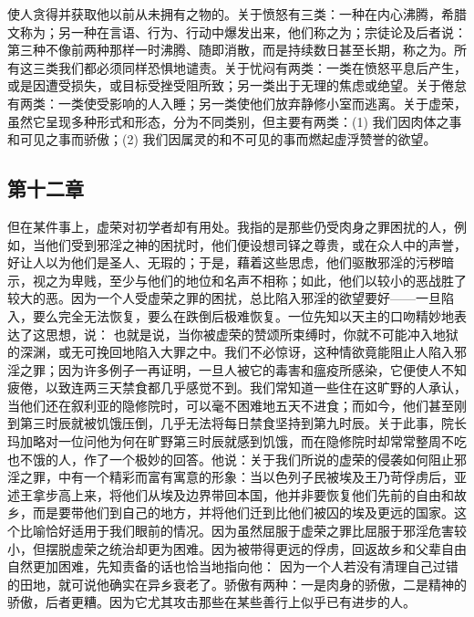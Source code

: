 使人贪得并获取他以前从未拥有之物的。关于愤怒有三类：一种在内心沸腾，希腊文称为；另一种在言语、行为、行动中爆发出来，他们称之为；宗徒论及后者说： 第三种不像前两种那样一时沸腾、随即消散，而是持续数日甚至长期，称之为。所有这三类我们都必须同样恐惧地谴责。关于忧闷有两类：一类在愤怒平息后产生，或是因遭受损失，或目标受挫受阻所致；另一类出于无理的焦虑或绝望。关于倦怠有两类：一类使受影响的人入睡；另一类使他们放弃静修小室而逃离。关于虚荣，虽然它呈现多种形式和形态，分为不同类别，但主要有两类：(1) 我们因肉体之事和可见之事而骄傲；(2) 我们因属灵的和不可见的事而燃起虚浮赞誉的欲望。\par


\subsection{第十二章}

\par

但在某件事上，虚荣对初学者却有用处。我指的是那些仍受肉身之罪困扰的人，例如，当他们受到邪淫之神的困扰时，他们便设想司铎之尊贵，或在众人中的声誉，好让人以为他们是圣人、无瑕的；于是，藉着这些思虑，他们驱散邪淫的污秽暗示，视之为卑贱，至少与他们的地位和名声不相称；如此，他们以较小的恶战胜了较大的恶。因为一个人受虚荣之罪的困扰，总比陷入邪淫的欲望要好——一旦陷入，要么完全无法恢复，要么在跌倒后极难恢复。一位先知以天主的口吻精妙地表达了这思想，说： 也就是说，当你被虚荣的赞颂所束缚时，你就不可能冲入地狱的深渊，或无可挽回地陷入大罪之中。我们不必惊讶，这种情欲竟能阻止人陷入邪淫之罪；因为许多例子一再证明，一旦人被它的毒害和瘟疫所感染，它便使人不知疲倦，以致连两三天禁食都几乎感觉不到。我们常知道一些住在这旷野的人承认，当他们还在叙利亚的隐修院时，可以毫不困难地五天不进食；而如今，他们甚至刚到第三时辰就被饥饿压倒，几乎无法将每日禁食坚持到第九时辰。关于此事，院长玛加略对一位问他为何在旷野第三时辰就感到饥饿，而在隐修院时却常常整周不吃也不饿的人，作了一个极妙的回答。他说：关于我们所说的虚荣的侵袭如何阻止邪淫之罪，中有一个精彩而富有寓意的形象：当以色列子民被埃及王乃苛俘虏后，亚述王拿步高上来，将他们从埃及边界带回本国，他并非要恢复他们先前的自由和故乡，而是要带他们到自己的地方，并将他们迁到比他们被囚的埃及更远的国家。这个比喻恰好适用于我们眼前的情况。因为虽然屈服于虚荣之罪比屈服于邪淫危害较小，但摆脱虚荣之统治却更为困难。因为被带得更远的俘虏，回返故乡和父辈自由自然更加困难，先知责备的话也恰当地指向他： 因为一个人若没有清理自己过错的田地，就可说他确实在异乡衰老了。骄傲有两种：一是肉身的骄傲，二是精神的骄傲，后者更糟。因为它尤其攻击那些在某些善行上似乎已有进步的人。\par

